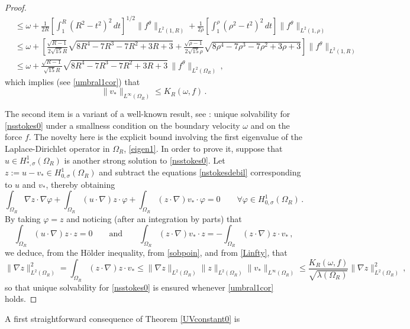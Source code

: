\documentclass[a4paper,11pt]{article}
\numberwithin{equation}{section}
\numberwithin{figure}{section}
\begin{document}
\begin{proof}
$$\begin{aligned}
   &\le \omega+\frac{1}{2R}\left[\int_{1}^{R}(R^2-t^2)^2\, dt\right]^{1/2}\|f^{\theta}\|_{L^2(1,R)}
   +\frac1{2\rho}\left[\int_{1}^{\rho}(\rho^2-t^2)^2\, dt\right]\|f^{\theta}\|_{L^2(1,\rho)}\\[6pt]
   &\le \omega+\left[\frac{\sqrt{R-1}}{2\sqrt{15}R}\sqrt{8R^4-7R^3-7R^2+3R+3}
   +\frac{\sqrt{\rho-1}}{2\sqrt{15}\rho}\sqrt{8\rho^4-7\rho^3-7\rho^2+3\rho+3}\right]\|f^{\theta}\|_{L^2(1,R)}\\[6pt]
   &\le \omega+\frac{\sqrt{R-1}}{\sqrt{15}R}\sqrt{8R^4-7R^3-7R^2+3R+3}\, \|f^{\theta}\|_{L^2(\Omega_R)} \, ,
\end{aligned}
$$
which implies (see \eqref{umbral1cor}) that
\begin{equation}\label{Linfty}
\|v_{*}\|_{L^{\infty}(\Omega_{R})}\le K_{R}(\omega,f)\, .
\end{equation}

The second item is a variant of a well-known result, see \cite[Section IX.4]{galdi2011introduction}: unique solvability for \eqref{nsstokes0}
under a
smallness condition on the boundary velocity $\omega$ and on the force $f$. The novelty here is the explicit bound involving the first eigenvalue
of
the Laplace-Dirichlet operator in $\Omega_{R}$, \eqref{eigen1}. In order to prove it, suppose that $u \in H^{1}_{*,\sigma}(\Omega_{R})$ is another strong
solution to  \eqref{nsstokes0}. Let $z := u - v_{*} \in H^{1}_{0,\sigma}(\Omega_{R})$ and subtract the equations \eqref{nstokesdebil}
corresponding to $u$ and $v_{*}$, thereby obtaining
$$
\int_{\Omega_{R}} \nabla z \cdot \nabla \varphi + \int_{\Omega_{R}} (u \cdot \nabla) z \cdot \varphi + \int_{\Omega_{R}} (z \cdot \nabla) v_{*}
\cdot \varphi = 0 \qquad \forall \varphi \in H^{1}_{0,\sigma}(\Omega_{R}) \, .
$$
By taking $\varphi=z$ and noticing (after an integration by parts) that
$$
\int_{\Omega_{R}} (u \cdot \nabla) z \cdot z = 0 \qquad \text{and} \qquad \int_{\Omega_{R}} (z \cdot \nabla) v_{*} \cdot z = - \int_{\Omega_{R}}
(z \cdot \nabla) z \cdot v_{*} \, ,
$$
we deduce, from the H\"older inequality, from \eqref{sobpoin}, and from \eqref{Linfty}, that
$$
\|\nabla z\|^2_{L^2(\Omega_{R})} = \int_{\Omega_{R}} (z \cdot \nabla) z \cdot v_{*}\leq \|\nabla z\|_{L^2(\Omega_{R})} \|z\|_{L^2(\Omega_{R})} \|
v_{*} \|_{L^{\infty}(\Omega_{R})}\leq \dfrac{K_{R}(\omega,f)}{\sqrt{\lambda(\Omega_R)}}\|\nabla z\|^{2}_{L^2(\Omega_{R})}\, ,
$$
so that unique solvability for \eqref{nsstokes0} is ensured whenever \eqref{umbral1cor} holds.\end{proof}

A first straightforward consequence of Theorem \ref{UVconstant0} is
\end{document}
